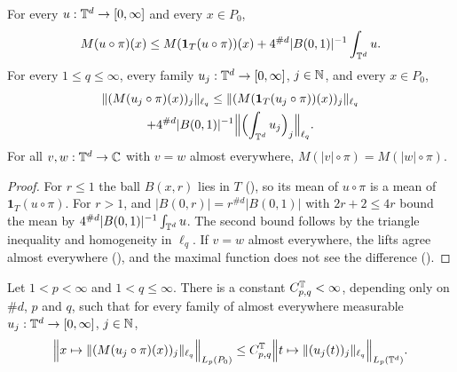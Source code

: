 \begin{lemma}
\label{lem:torus-maximal-localisation}
\leanok
{}
For every $u : \mathbb{T}^d \to [0, \infty]$ and every $x \in P_0$,
\[
  M(u \circ \pi)(x) \leq M(\mathbf 1_T (u \circ \pi))(x) + 4^{\#d} |B(0,1)|^{-1}
  \int_{\mathbb{T}^d} u .
\]
For every $1 \leq q \leq \infty$, every family $u_j : \mathbb{T}^d \to [0, \infty]$, $j \in \mathbb{N}$, and every
$x \in P_0$,
\begin{multline*}
  \|(M(u_j \circ \pi)(x))_j\|_{\ell_q} \leq \|(M(\mathbf 1_T (u_j \circ \pi))(x))_j\|_{\ell_q} \\
  + 4^{\#d} |B(0,1)|^{-1} \Bigl\| \Bigl(\int_{\mathbb{T}^d} u_j\Bigr)_j \Bigr\|_{\ell_q} .
\end{multline*}
For all $v, w : \mathbb{T}^d \to \mathbb{C}$ with $v = w$ almost everywhere,
$M(|v| \circ \pi) = M(|w| \circ \pi)$.
\end{lemma}

\begin{proof}
\leanok
For $r \leq 1$ the ball $B(x, r)$ lies in $T$ (), so its mean of
$u \circ \pi$ is a mean of $\mathbf 1_T (u \circ \pi)$. For $r > 1$,
 and $|B(0, r)| = r^{\#d} |B(0, 1)|$ with $2r + 2 \leq 4r$ bound
the mean by $4^{\#d} |B(0,1)|^{-1} \int_{\mathbb{T}^d} u$. The second bound follows by the triangle
inequality and homogeneity in $\ell_q$. If $v = w$ almost everywhere, the lifts agree almost
everywhere (), and the maximal function does not see the difference
().
\end{proof}

\begin{theorem}
\label{thm:fefferman-stein-periodic}
\leanok
{}
Let $1 < p < \infty$ and $1 < q \leq \infty$. There is a constant $C^{\mathbb{T}}_{p,q} < \infty$,
depending only on $\#d$, $p$ and $q$, such that for every family of almost everywhere measurable
$u_j : \mathbb{T}^d \to [0, \infty]$, $j \in \mathbb{N}$,
\[
  \Bigl\| x \mapsto \|(M(u_j \circ \pi)(x))_j\|_{\ell_q} \Bigr\|_{L_p(P_0)}
  \leq C^{\mathbb{T}}_{p,q} \Bigl\| t \mapsto \|(u_j(t))_j\|_{\ell_q} \Bigr\|_{L_p(\mathbb{T}^d)} .
\]
\end{theorem}

